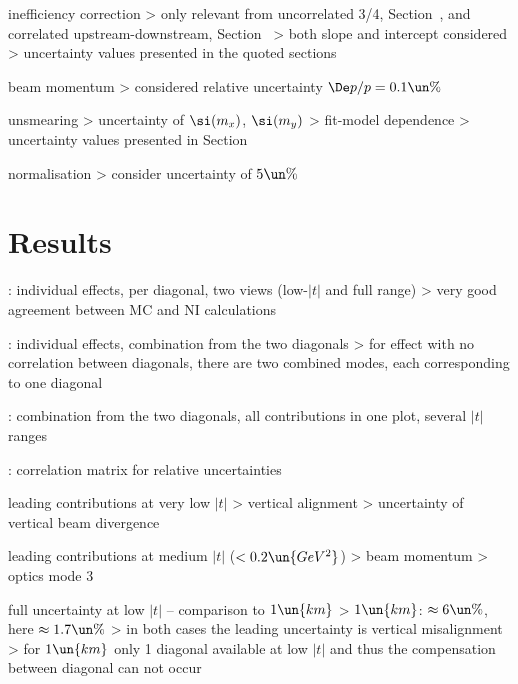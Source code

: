 \> inefficiency correction
\>> only relevant from uncorrelated 3/4, Section~, and correlated upstream-downstream, Section~
\>> both slope and intercept considered
\>> uncertainty values presented in the quoted sections

\> beam momentum
\>> considered relative uncertainty $\De p/p = 0.1\un{\%}$

\> unsmearing
\>> uncertainty of $\si(m_x)$, $\si(m_y)$
\>> fit-model dependence
\>> uncertainty values presented in Section~

\> normalisation
\>> consider uncertainty of $5\un{\%}$


\section[systematics-results]{Results}

\>  : individual effects, per diagonal, two views (low-$|t|$ and full range)
\>> very good agreement between MC and NI calculations

\>  : individual effects, combination from the two diagonals
\>> for effect with no correlation between diagonals, there are two combined modes, each corresponding to one diagonal

\>  : combination from the two diagonals, all contributions in one plot, several $|t|$ ranges

\>  : correlation matrix for relative uncertainties

\> leading contributions at very low $|t|$
\>> vertical alignment
\>> uncertainty of vertical beam divergence

\> leading contributions at medium $|t|$ ($< 0.2\un{GeV^2}$)
\>> beam momentum
\>> optics mode 3

\> full uncertainty at low $|t|$ -- comparison to $1\un{km}$
\>> $1\un{km}$: $\approx 6\un{\%}$, here $\approx 1.7\un{\%}$
\>> in both cases the leading uncertainty is vertical misalignment
\>> for $1\un{km}$ only 1 diagonal available at low $|t|$ and thus the compensation between diagonal can not occur



\EndText
\bye
